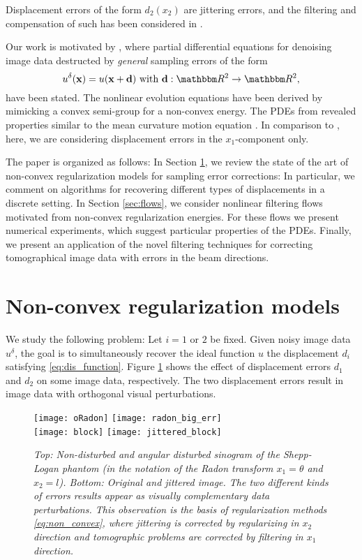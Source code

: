 \documentclass[runningheads,a4paper]{llncs}\usepackage{latexsym}
\newcommand{\R}{\mathbbm R}
\newcommand{\ud}{u^\delta}
\begin{document}
Displacement errors of the form $d_2(x_2)$ are jittering errors, and the filtering and compensation 
of such has been considered in \cite{She04,KanShe06,Nik09p,Nik09,DonPatSchOek15}.

Our work is motivated by \cite{LenSch11,LenSch09}, where partial differential equations 
for denoising image data destructed by \emph{general} sampling errors of the form
\[\ud(\mathbf{x})=u(\mathbf{x}+\mathbf{d}) 
\text{ with } \mathbf{d}:\R^2 \rightarrow \R^2,\]
have been stated. The nonlinear evolution equations have been derived by 
mimicking a convex semi-group for a non-convex energy. The PDEs from \cite{LenSch11,LenSch09} 
revealed properties similar to the mean curvature motion equation \cite{EvaSpr91,EvaSpr92}. 
In comparison to \cite{LenSch11,LenSch09}, here, we are considering displacement errors in the 
$x_1$-component only.

The paper is organized as follows:
In Section \ref{sec:regularization}, we review the state of the art of non-convex regularization models for 
sampling error corrections: 
In particular, we comment on algorithms for recovering different types of displacements in a discrete setting.
In Section \ref{sec:flows}, we consider nonlinear filtering flows motivated from non-convex regularization energies.
For these flows we present numerical experiments, which suggest particular properties of the PDEs.
Finally, we present an application of the novel filtering techniques for correcting tomographical image data 
with errors in the beam directions.

\section{Non-convex regularization models}
\label{sec:regularization}
We study the following problem: Let $i=1$ or $2$ be fixed.
Given noisy image data $\ud$, the goal is to simultaneously recover the ideal function $u$  the 
displacement $d_i$ satisfying \eqref{eq:dis_function}. 
Figure \ref{fig:displacement} shows the effect of displacement errors $d_1$ and $d_2$ on some image data, respectively. 
The two displacement errors result in image data with orthogonal visual perturbations.
\begin{figure}[bht]
\centering
\texttt{[image: oRadon]}  \texttt{[image: radon\_big\_err]}  \\
\texttt{[image: block]}  \texttt{[image: jittered\_block]} 
\caption{\sl{Top:} Non-disturbed and angular disturbed sinogram of the Shepp-Logan phantom (in the notation of the Radon transform 
         $x_1=\theta$ and $x_2=l$). \sl{Bottom:} Original and jittered image. The two different kinds of errors 
         results appear as visually complementary data perturbations. This observation is the basis of regularization methods 
         \eqref{eq:non_convex}, 
         where jittering is corrected by regularizing in $x_2$ direction and tomographic problems are corrected by filtering 
         in $x_1$ direction.}
\label{fig:displacement}
\end{figure}
\end{document}
